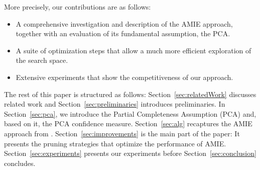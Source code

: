 \noindent More precisely, our contributions are as follows:
\begin{itemize}[noitemsep,nolistsep,leftmargin=0.4cm,midpenalty=0,label=$\bullet$]
\item A comprehensive investigation and description of the AMIE approach, together with an evaluation of its fundamental assumption, the PCA. %
\item A suite of optimization steps that allow a much more efficient exploration of the search space.
\item Extensive experiments that show the competitiveness of our approach.
\end{itemize}
The rest of this paper is structured as follows: Section~\ref{sec:relatedWork} discusses related work and Section~\ref{sec:preliminaries} introduces preliminaries.
In Section~\ref{sec:pca}, we introduce the Partial Completeness Assumption (PCA) and, based on it, the PCA confidence measure.
Section~\ref{sec:alg} recaptures the AMIE approach from \cite{amie}.
Section~\ref{sec:improvements} is the main part of the paper: It presents the pruning strategies that optimize the performance of AMIE.
Section~\ref{sec:experiments} presents our experiments before Section~\ref{sec:conclusion} concludes.





